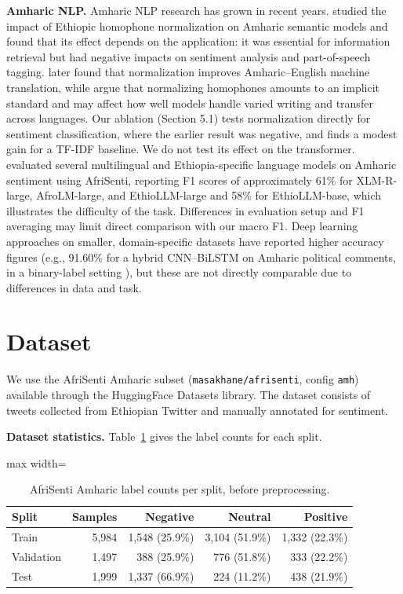 \textbf{Amharic NLP.} Amharic NLP research has grown in recent years. \citet{belay-etal-2021-impacts} studied the impact of Ethiopic homophone normalization on Amharic semantic models and found that its effect depends on the application: it was essential for information retrieval but had negative impacts on sentiment analysis and part-of-speech tagging. \citet{belay-etal-2022-effect} later found that normalization improves Amharic--English machine translation, while \citet{nigatu-etal-2025-case} argue that normalizing homophones amounts to an implicit standard and may affect how well models handle varied writing and transfer across languages. Our ablation (Section 5.1) tests normalization directly for sentiment classification, where the earlier result was negative, and finds a modest gain for a TF-IDF baseline. We do not test its effect on the transformer. \citet{tonja-etal-2024-ethiollm} evaluated several multilingual and Ethiopia-specific language models on Amharic sentiment using AfriSenti, reporting F1 scores of approximately 61\% for XLM-R-large, AfroLM-large, and EthioLLM-large and 58\% for EthioLLM-base, which illustrates the difficulty of the task. Differences in evaluation setup and F1 averaging may limit direct comparison with our macro F1. Deep learning approaches on smaller, domain-specific datasets have reported higher accuracy figures (e.g., 91.60\% for a hybrid CNN--BiLSTM on Amharic political comments, in a binary-label setting \citep{alemayehu-etal-2023-amharic}), but these are not directly comparable due to differences in data and task.


\section{Dataset}

We use the AfriSenti Amharic subset (\texttt{masakhane/afrisenti}, config \texttt{amh}) available through the HuggingFace Datasets library. The dataset consists of tweets collected from Ethiopian Twitter and manually annotated for sentiment.

\textbf{Dataset statistics.} Table~\ref{tab:data} gives the label counts for each split.

\begin{table}[t]
\centering\small
\begin{adjustbox}{max width=\linewidth}
\begin{tabular}{lrrrr}
\toprule
Split & Samples & Negative & Neutral & Positive \\
\midrule
Train & 5,984 & 1,548 (25.9\%) & 3,104 (51.9\%) & 1,332 (22.3\%) \\
Validation & 1,497 & 388 (25.9\%) & 776 (51.8\%) & 333 (22.2\%) \\
Test & 1,999 & 1,337 (66.9\%) & 224 (11.2\%) & 438 (21.9\%) \\
\bottomrule
\end{tabular}
\end{adjustbox}
\caption{AfriSenti Amharic label counts per split, before preprocessing.}
\label{tab:data}
\end{table}

